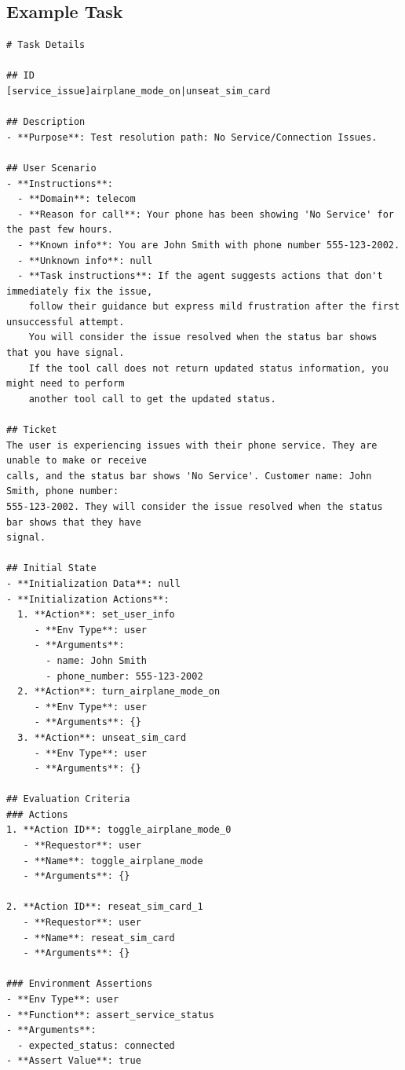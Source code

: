 \subsection{Example Task}
\label{app:telecom-example-task}

\begin{verbatim}
# Task Details

## ID
[service_issue]airplane_mode_on|unseat_sim_card

## Description
- **Purpose**: Test resolution path: No Service/Connection Issues.

## User Scenario
- **Instructions**:
  - **Domain**: telecom
  - **Reason for call**: Your phone has been showing 'No Service' for the past few hours.
  - **Known info**: You are John Smith with phone number 555-123-2002.
  - **Unknown info**: null
  - **Task instructions**: If the agent suggests actions that don't immediately fix the issue, 
    follow their guidance but express mild frustration after the first unsuccessful attempt. 
    You will consider the issue resolved when the status bar shows that you have signal. 
    If the tool call does not return updated status information, you might need to perform 
    another tool call to get the updated status.

## Ticket
The user is experiencing issues with their phone service. They are unable to make or receive 
calls, and the status bar shows 'No Service'. Customer name: John Smith, phone number: 
555-123-2002. They will consider the issue resolved when the status bar shows that they have 
signal.

## Initial State
- **Initialization Data**: null
- **Initialization Actions**:
  1. **Action**: set_user_info
     - **Env Type**: user
     - **Arguments**:
       - name: John Smith
       - phone_number: 555-123-2002
  2. **Action**: turn_airplane_mode_on
     - **Env Type**: user
     - **Arguments**: {}
  3. **Action**: unseat_sim_card
     - **Env Type**: user
     - **Arguments**: {}

## Evaluation Criteria
### Actions
1. **Action ID**: toggle_airplane_mode_0
   - **Requestor**: user
   - **Name**: toggle_airplane_mode
   - **Arguments**: {}

2. **Action ID**: reseat_sim_card_1
   - **Requestor**: user
   - **Name**: reseat_sim_card
   - **Arguments**: {}

### Environment Assertions
- **Env Type**: user
- **Function**: assert_service_status
- **Arguments**:
  - expected_status: connected
- **Assert Value**: true
\end{verbatim}


